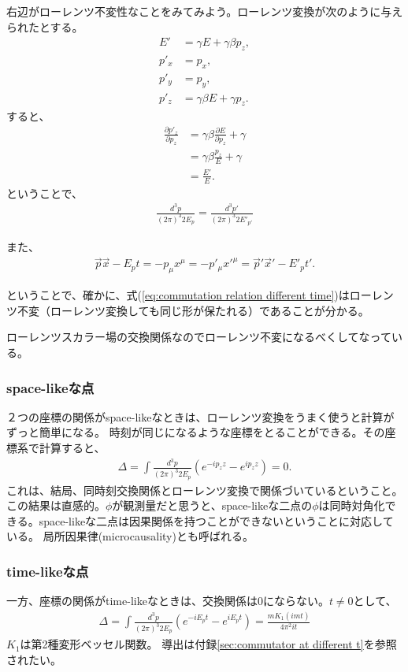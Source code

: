 \documentclass[10pt,a4paper]{jarticle}
\begin{document}
右辺がローレンツ不変性なことをみてみよう。ローレンツ変換が次のように与えられたとする。
\begin{align}
E' &= \gamma E + \gamma\beta p_z, \\
p'_x &= p_x, \\
p'_y &= p_y, \\
p'_z &= \gamma\beta E + \gamma p_z.
\end{align}
すると、
\begin{align}
\frac{\partial p'_z}{\partial p_z}
&= \gamma\beta \frac{\partial E}{\partial p_z} + \gamma \nonumber\\
&= \gamma\beta \frac{p_z}{E} + \gamma \nonumber\\
&= \frac{E'}{E}.
\end{align}
ということで、
\begin{align}
\frac{d^3 p}{(2\pi)^3 2E_p} = \frac{d^3 p'}{(2\pi)^3 2E'_{p'}}
\end{align}

また、
\begin{align}
\vec p \vec x -  E_p t = -p_\mu x^\mu = -p'_\mu {x'}^\mu = \vec p' \vec x' -  E'_p t'.
\end{align}

ということで、確かに、式(\ref{eq:commutation relation different time})はローレンツ不変（ローレンツ変換しても同じ形が保たれる）であることが分かる。

ローレンツスカラー場の交換関係なのでローレンツ不変になるべくしてなっている。

\subsubsection{space-likeな点}
２つの座標の関係がspace-likeなときは、ローレンツ変換をうまく使うと計算がずっと簡単になる。
時刻が同じになるような座標をとることができる。その座標系で計算すると、
\begin{align}
\Delta = \int \frac{d^3 p}{(2\pi)^3 2E_p} ( e^{-ip_z z} - e^{ip_z z}) = 0.
\end{align}
これは、結局、同時刻交換関係とローレンツ変換で関係づいているということ。
この結果は直感的。$\phi$が観測量だと思うと、space-likeな二点の$\phi$は同時対角化できる。space-likeな二点は因果関係を持つことができないということに対応している。
局所因果律(microcausality)とも呼ばれる。

\subsubsection{time-likeな点}
一方、座標の関係がtime-likeなときは、交換関係は$0$にならない。$t\neq 0$として、
\begin{align}
\Delta = \int \frac{d^3 p}{(2\pi)^3 2E_p} ( e^{-iE_p t} - e^{iE_p t})
= \frac{m K_1(imt)}{4\pi^2 it} \label{eq:commutator at different t QFT}
\end{align}
$K_1$は第2種変形ベッセル関数。
導出は付録\ref{sec:commutator at different t}を参照されたい。
\end{document}
